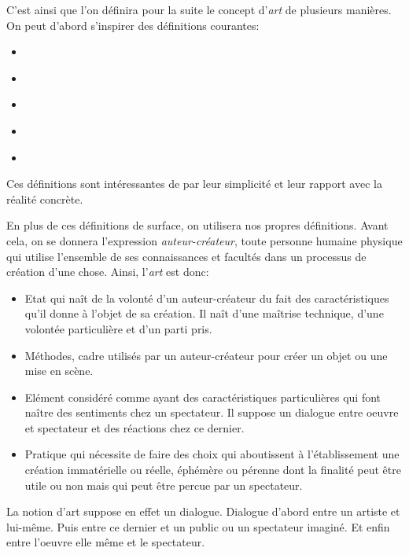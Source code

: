 \documentclass[12pt]{article} %
\begin{document}
C'est ainsi que l'on définira pour la suite le concept d'\textit{art} de plusieurs manières. On peut d'abord s'inspirer des définitions courantes:
\begin{itemize}
    \item {} \cite{WiktionnaireFr-art}
    \item {} \cite{WiktionnaireFr-art}
    \item {} \cite{LarousseOnline-art}
    \item {} \cite{LarousseOnline-art}
    \item {} \cite{LarousseOnline-art}
\end{itemize}
Ces définitions sont intéressantes de par leur simplicité et leur rapport avec la réalité concrète. 

En plus de ces définitions de surface, on utilisera nos propres définitions. Avant cela, on se donnera l'expression \textit{auteur-créateur}, toute personne humaine physique qui utilise l'ensemble de ses connaissances et facultés dans un processus de création d'une chose. Ainsi, l'\textit{art} est donc:
\begin{itemize}
    \item Etat qui naît de la volonté d'un auteur-créateur du fait des caractéristiques qu'il donne à l'objet de sa création. Il naît d'une maîtrise technique, d'une volontée particulière et d'un parti pris.
    \item Méthodes, cadre utilisés par un auteur-créateur pour créer un objet ou une mise en scène.
    \item Elément considéré comme ayant des caractéristiques particulières qui font naître des sentiments chez un spectateur. Il suppose un dialogue entre oeuvre et spectateur et des réactions chez ce dernier.
    \item Pratique qui nécessite de faire des choix qui aboutissent à l'établissement une création immatérielle ou réelle, éphémère ou pérenne dont la finalité peut être utile ou non mais qui peut être percue par un spectateur.
\end{itemize}
La notion d'art suppose en effet un dialogue. Dialogue d'abord entre un artiste et lui-même. Puis entre ce dernier et un public ou un spectateur imaginé. Et enfin entre l'oeuvre elle même et le spectateur. 
\end{document}
